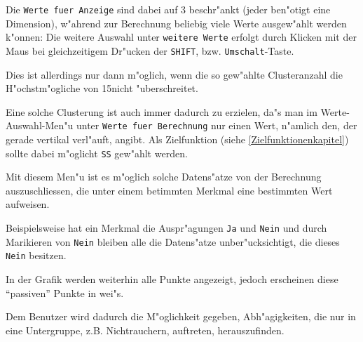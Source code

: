 \newcommand{\MAXCLUSTER}{15}


Die \verb-Werte fuer Anzeige- sind dabei auf 3 beschr"ankt (jeder
ben"otigt eine Dimension), w"ahrend zur Berechnung beliebig viele
Werte ausgew"ahlt werden k"onnen: Die weitere Auswahl
unter \verb-weitere Werte- erfolgt durch Klicken  mit der Maus
bei gleichzeitigem Dr"ucken der \verb-SHIFT-, bzw. \verb-Umschalt--Taste.





Dies ist allerdings nur dann m"oglich, wenn die so gew"ahlte Clusteranzahl
die H"ochstm"ogliche von \MAXCLUSTER nicht "uberschreitet.





Eine solche Clusterung ist auch immer dadurch zu erzielen, da"s man im
Werte-Auswahl-Men"u unter \verb-Werte fuer Berechnung- nur einen Wert, 
n"amlich den, der gerade vertikal verl"auft, angibt. Als Zielfunktion
(siehe \ref{Zielfunktionenkapitel}) sollte dabei m"oglicht \verb-SS-
gew"ahlt werden.


\item[Unterbereiche] Mit diesem Men"u ist es m"oglich solche Datens"atze
	von der Berechnung auszuschliessen, die unter einem betimmten
	Merkmal eine bestimmten Wert aufweisen.

	Beispielsweise hat ein Merkmal die Auspr"agungen \verb-Ja- und 
	\verb-Nein- und durch Marikieren von \verb-Nein- bleiben alle
	die Datens"atze unber"ucksichtigt, die dieses \verb-Nein-
	besitzen.

	In der Grafik werden weiterhin alle Punkte angezeigt, jedoch
	erscheinen diese "`passiven"' Punkte in wei"s.

	Dem Benutzer wird dadurch die M"oglichkeit gegeben, Abh"agigkeiten, 
	die nur in eine Untergruppe, z.B. Nichtrauchern, auftreten, 
	herauszufinden.


